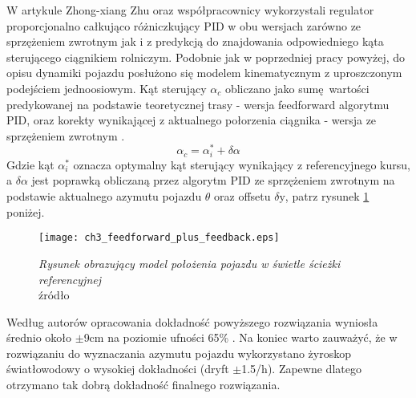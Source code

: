 \indent W artykule \cite[]{feed_forward_back} Zhong-xiang Zhu oraz współpracownicy wykorzystali regulator proporcjonalno całkująco różniczkujący PID 
w obu wersjach zarówno ze sprzężeniem zwrotnym jak i z predykcją do znajdowania odpowiedniego kąta sterującego ciągnikiem rolniczym.
Podobnie jak w poprzedniej pracy powyżej, do opisu dynamiki pojazdu posłużono się modelem kinematycznym z uproszczonym podejściem jednoosiowym.
Kąt sterujący ${\alpha}_c$ obliczano jako sumę wartości predykowanej na podstawie teoretycznej trasy - wersja feedforward algorytmu PID, oraz korekty wynikającej 
z aktualnego połorzenia ciągnika - wersja ze sprzężeniem zwrotnym \cite[][strona 1599]{feed_forward_back}. 
\begin{equation}
	{\alpha}_c = {\alpha}_i^* + \delta\alpha
\end{equation}
Gdzie kąt ${\alpha}_{i}^{*}$ oznacza optymalny kąt sterujący wynikający z referencyjnego kursu, a $\delta\alpha$ jest poprawką obliczaną przez algorytm 
PID ze sprzężeniem zwrotnym na podstawie aktualnego azymutu pojazdu $\theta$ oraz offsetu $\delta\text{y}$, patrz rysunek \ref{fig:both_forward_back} poniżej.

\begin{figure}[H]
        \centering
        \texttt{[image: ch3\_feedforward\_plus\_feedback.eps]}
        \caption{\textit{Rysunek obrazujący model położenia pojazdu w świetle ścieżki referencyjnej}\\
        źródło \cite[][strona 1598]{feed_forward_back}}
        \label{fig:both_forward_back}
\end{figure}
Według autorów opracowania dokładność powyższego rozwiązania wyniosła średnio około $\pm$9cm na poziomie ufności 65\% \cite[][strona 1602]{feed_forward_back}.
Na koniec warto zauważyć, że w rozwiązaniu do wyznaczania azymutu pojazdu wykorzystano żyroskop światłowodowy o wysokiej dokładności (dryft $\pm$1.5\degree/h).
Zapewne dlatego otrzymano tak dobrą dokładność finalnego rozwiązania.

